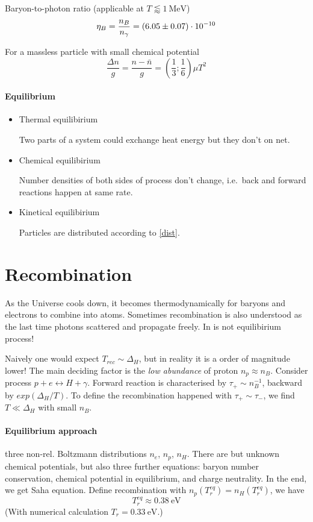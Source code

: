 \documentclass[12pt, a4paper, DIV=15]{article}
\numberwithin{equation}{section}
\begin{document}
Baryon-to-photon ratio (applicable at $T \lessapprox \SI{1}{\mega\eV}$)
\begin{equation}
   \eta_B = \frac{n_B}{n_\gamma} = (\num{6.05 +- 0.07} )\cdot 10^{-10}
\end{equation}

For a massless particle with small chemical potential
\begin{equation}
   \frac{\Delta n}{g} = \frac{n - \bar{n}}{g} = (\frac{1}{3}; \frac{1}{6}) \mu T^2
\end{equation}
\paragraph{Equilibrium}
\begin{itemize}
   \item  Thermal equilibirium

      Two parts of a system could exchange heat energy but they don't on net.

   \item Chemical equilibirium

      Number densities of both sides of process don't change, i.e.~back and forward reactions happen at same rate.

   \item Kinetical equilibirium

      Particles are distributed according to \eqref{dist}.
\end{itemize}

\section{Recombination}
As the Universe cools down, it becomes thermodynamically for baryons and electrons to combine into atoms. Sometimes recombination is also understood as the last time photons scattered and propagate freely. In is not equilibirium process!

Naively one would expect $T_{rec} \sim \Delta_H$, but in reality it is a order of magnitude lower! The main deciding factor is the \textit{low abundance} of proton $n_p \approx n_B$. Consider process $p + e \leftrightarrow H + \gamma$. Forward reaction is characterised by $\tau_+ \sim n_B^{-1}$,  backward  by $exp(\Delta_H / T)$. To define the recombination happened with $\tau_+ \sim \tau_-$, we find $T \ll \Delta_H $ with small $n_B$.

\paragraph{Equilibrium approach} three non-rel. Boltzmann distributions $n_e$, $n_p$, $n_H$. There are but unknown chemical potentials, but also three further equations: baryon number conservation, chemical potential in equilibrium, and charge neutrality. In the end, we get Saha equation. Define recombination with $n_p (T^{eq}_r) = n_H(T_r^{eq})$, we have
\begin{equation}
   T_r^{eq} \approx \SI{0.38}{\eV}
\end{equation}
(With numerical calculation $T_r = \SI{0.33}{\eV}$.)
\end{document}
